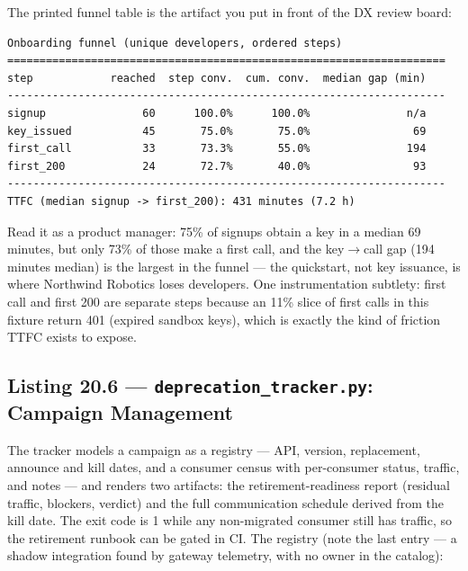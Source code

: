 The printed funnel table is the artifact you put in front of the DX
review board:

\begin{verbatim}
Onboarding funnel (unique developers, ordered steps)
====================================================================
step            reached  step conv.  cum. conv.  median gap (min)
--------------------------------------------------------------------
signup               60      100.0%      100.0%               n/a
key_issued           45       75.0%       75.0%                69
first_call           33       73.3%       55.0%               194
first_200            24       72.7%       40.0%                93
--------------------------------------------------------------------
TTFC (median signup -> first_200): 431 minutes (7.2 h)
\end{verbatim}

Read it as a product manager: 75\% of signups obtain a key in a median 69
minutes, but only 73\% of those make a first call, and the
key$\rightarrow$call gap (194 minutes median) is the largest in the funnel
--- the quickstart, not key issuance, is where Northwind Robotics loses
developers. One instrumentation subtlety: \textsf{first call} and
\textsf{first 200} are separate steps because an 11\% slice of first calls
in this fixture return 401 (expired sandbox keys), which is exactly the
kind of friction TTFC exists to expose.

\subsection{Listing 20.6 --- \texttt{deprecation\_tracker.py}: Campaign Management}
\label{sec:ch20-listing-deprecation}

The tracker models a campaign as a registry --- API, version, replacement,
announce and kill dates, and a consumer census with per-consumer status,
traffic, and notes --- and renders two artifacts: the retirement-readiness
report (residual traffic, blockers, verdict) and the full communication
schedule derived from the kill date. The exit code is 1 while any
non-migrated consumer still has traffic, so the retirement runbook can be
gated in CI. The registry (note the last entry --- a shadow integration
found by gateway telemetry, with no owner in the catalog):

